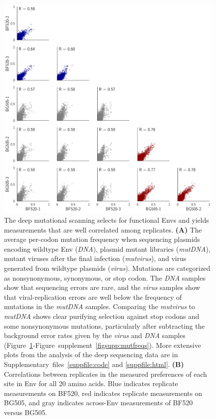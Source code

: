\documentclass[9pt]{elife}
\begin{document}
\begin{figure}
\begin{minipage}[t]{0.65\textwidth}
\includegraphics[width=\textwidth]{figures/allprefscorr.pdf}
\end{minipage}
\caption{\label{fig:mutfreqs}
The deep mutational scanning selects for functional Envs and yields measurements that are well correlated among replicates.
{\bf (A)}
The average per-codon mutation frequency when sequencing plasmids encoding wildtype Env (\emph{DNA}), plasmid mutant libraries (\emph{mutDNA}), mutant viruses after the final infection (\emph{mutvirus}), and virus generated from wildtype plasmids (\emph{virus}).
Mutations are categorized as nonsynonymous, synonymous, or stop codon. 
The \emph{DNA} samples show that sequencing errors are rare, and the \emph{virus} samples show that viral-replication errors are well below the frequency of mutations in the \emph{mutDNA} samples.
Comparing the \emph{mutvirus} to \emph{mutDNA} shows clear purifying selection against stop codons and some nonsynonymous mutations, particularly after subtracting the background error rates given by the \emph{virus} and \emph{DNA} samples (Figure~\ref{fig:mutfreqs}-Figure~supplement~\ref{figsupp:mutfreqs}).
More extensive plots from the analysis of the deep sequencing data are in Supplementary~files~\ref{suppfile:code} and \ref{suppfile:html}.
{\bf (B)}
Correlations between replicates in the measured preferences of each site in Env for all 20 amino acids.
Blue indicates replicate measurements on BF520, red indicates replicate measurements on BG505, and gray indicates across-Env measurements of BF520 versus BG505.
}
\end{figure}
\end{document}
